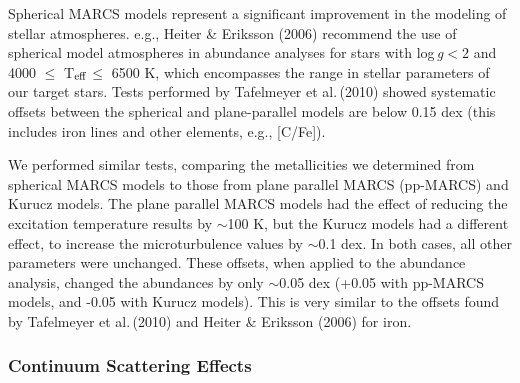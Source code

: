 \documentclass{emulateapj}
\newcommand\teff{T$_{\rm eff}$}
\newcommand\logg{log\,{\it g}}
\newcommand\etal{{\rm et al.\,}}
\begin{document}
Spherical MARCS models represent a significant improvement in the
modeling of stellar atmospheres.
%
e.g., Heiter \& Eriksson (2006) recommend
the use of spherical model atmospheres in abundance analyses for
stars with \logg $< 2$ and 4000 $\le$ \teff $\le$ 6500 K, which encompasses 
the range in stellar parameters of our target stars.   
% 
Tests performed by Tafelmeyer \etal (2010) showed systematic offsets 
between the spherical and plane-parallel models are below 0.15 dex
(this includes iron lines and other elements, e.g., [C/Fe]).
 
We performed similar tests, comparing the metallicities we determined from
spherical MARCS models to those from plane parallel MARCS (pp-MARCS) 
and Kurucz models.   
The plane parallel MARCS models had the effect of reducing the excitation 
temperature results by $\sim$100 K, but the Kurucz models had a different effect, 
to increase the microturbulence values by $\sim$0.1 dex.   In both cases,
all other parameters were unchanged.   
%
These offsets, when applied to the abundance analysis, changed
the  abundances by only $\sim$0.05 dex
(+0.05 with pp-MARCS models, and -0.05 with Kurucz models).    
This is very similar to the offsets found by Tafelmeyer \etal (2010) 
and Heiter \& Eriksson (2006) for iron.



\subsubsection{Continuum Scattering Effects \label{scat}}
\end{document}
